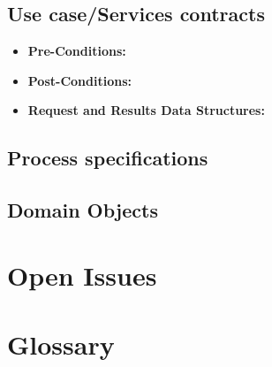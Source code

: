 \documentclass[12pt]{article}
\begin{document}
			
		
		\subsection{Use case/Services contracts}
		
			\vspace{0.2in}
			
			\begin{itemize}
				\item \textbf{Pre-Conditions:}
				\item \textbf{Post-Conditions:}
				\item \textbf{Request and Results Data Structures:}
			\end{itemize}
		
		\subsection{Process specifications}
		
			\vspace{0.2in}
			
			
		
		\subsection{Domain Objects}
		
			\vspace{0.2in}
			
			
	
	\section{Open Issues}
	
		\vspace{0.2in}
		
		
	\newpage
	\section{Glossary}
	
\end{document}
